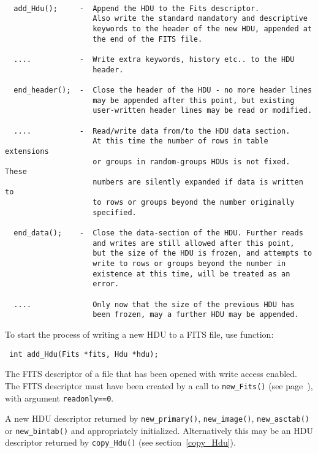 \label{addhdu_usage}\begin{verbatim}

  add_Hdu();     -  Append the HDU to the Fits descriptor.
                    Also write the standard mandatory and descriptive
                    keywords to the header of the new HDU, appended at
                    the end of the FITS file.

  ....           -  Write extra keywords, history etc.. to the HDU
                    header.

  end_header();  -  Close the header of the HDU - no more header lines
                    may be appended after this point, but existing
                    user-written header lines may be read or modified.

  ....           -  Read/write data from/to the HDU data section.
                    At this time the number of rows in table extensions
                    or groups in random-groups HDUs is not fixed. These
                    numbers are silently expanded if data is written to
                    to rows or groups beyond the number originally
                    specified.

  end_data();    -  Close the data-section of the HDU. Further reads
                    and writes are still allowed after this point,
                    but the size of the HDU is frozen, and attempts to
                    write to rows or groups beyond the number in
                    existence at this time, will be treated as an
                    error.

  ....              Only now that the size of the previous HDU has
                    been frozen, may a further HDU may be appended.
\end{verbatim}

To start the process of writing a new HDU to a FITS file, use function:
\label{add_Hdu}\begin{verbatim}
 int add_Hdu(Fits *fits, Hdu *hdu);
\end{verbatim}
\begin{arglist}

 The FITS descriptor of a file that has been opened with
             write access enabled. The FITS descriptor must have been
             created by a call to \verb`new_Fits()`
             (see page~\pageref{new_Fits}), with argument
             \verb`readonly==0`. 

 A new HDU descriptor returned by \verb`new_primary()`,
             \verb`new_image()`, \verb`new_asctab()` or \verb`new_bintab()` and
             appropriately initialized. Alternatively this may be an HDU
             descriptor returned by \verb`copy_Hdu()` (see
             section~\ref{copy_Hdu}). 
\end{arglist}

